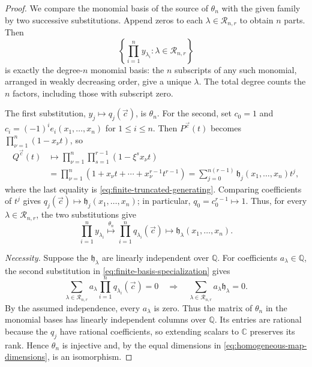\documentclass[12pt,reqno,a4paper]{amsart}
\numberwithin{equation}{section}
\numberwithin{figure}{section}
\theoremstyle{plain}
\theoremstyle{definition}
\begin{document}
\begin{proof}
We compare the monomial basis of the source of $\theta_n$ with the
given family by two successive substitutions.  Append zeros to
each $\lambda\in\mathcal R_{n,r}$ to obtain $n$ parts.  Then
\[
 \left\{\prod_{i=1}^n y_{\lambda_i}:
             \lambda\in\mathcal R_{n,r}\right\}
\]
is exactly the degree-$n$ monomial basis: the $n$ subscripts of any
such monomial, arranged in weakly decreasing order, give a unique
$\lambda$.  The total degree counts the $n$ factors, including
those with subscript zero.

The first substitution, $y_j\mapsto q_j(\vec c)$, is $\theta_n$.
For the second, set $c_0=1$ and
$c_i=(-1)^ie_i(x_1,\ldots,x_n)$ for $1\leq i\leq n$.
Then $P^{\vec c}(t)$ becomes $\prod_{\nu=1}^n(1-x_\nu t)$, so
\[
 \begin{aligned}
 Q^{\vec c}(t)&\longmapsto
   \prod_{\nu=1}^n\prod_{s=1}^{r-1}(1-\xi^s x_\nu t)\\
 &=\prod_{\nu=1}^n
      (1+x_\nu t+\cdots+x_\nu^{r-1}t^{r-1})
  =\sum_{j=0}^{n(r-1)}\mathfrak h_j(x_1,\ldots,x_n)t^j,
 \end{aligned}
\]
where the last equality is \eqref{eq:finite-truncated-generating}.
Comparing coefficients of $t^j$ gives
$q_j(\vec c)\mapsto\mathfrak h_j(x_1,\ldots,x_n)$; in particular,
$q_0=c_0^{r-1}\mapsto1$.  Thus, for every
$\lambda\in\mathcal R_{n,r}$, the two substitutions give
\begin{equation}\label{eq:finite-basis-specialization}
 \prod_{i=1}^n y_{\lambda_i}
 \overset{\theta_n}{\longmapsto}
 \prod_{i=1}^n q_{\lambda_i}(\vec c)
 \longmapsto\mathfrak h_\lambda(x_1,\ldots,x_n).
\end{equation}

\emph{Necessity.}  Suppose the $\mathfrak h_\lambda$ are linearly
independent over $\mathbb Q$.  For coefficients
$a_\lambda\in\mathbb Q$, the second substitution in
\eqref{eq:finite-basis-specialization} gives
\[
 \sum_{\lambda\in\mathcal R_{n,r}}a_\lambda
       \prod_{i=1}^n q_{\lambda_i}(\vec c)=0
 \quad\Longrightarrow\quad
 \sum_{\lambda\in\mathcal R_{n,r}}a_\lambda\mathfrak h_\lambda=0.
\]
By the assumed independence, every $a_\lambda$ is zero.
Thus the matrix of $\theta_n$ in the monomial bases has linearly
independent columns over $\mathbb Q$.  Its entries are rational
because the $q_j$ have rational coefficients, so extending scalars
to $\mathbb C$ preserves its rank.  Hence $\theta_n$ is injective
and, by the equal dimensions in \eqref{eq:homogeneous-map-dimensions},
is an isomorphism.


\end{proof}
\end{document}
